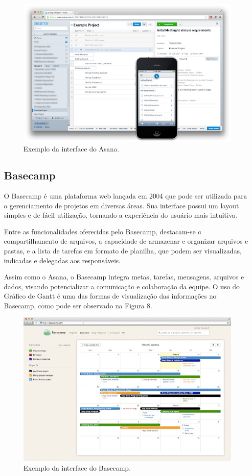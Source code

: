 \begin{figure}[htb]
	\caption{\label{fig:Fig_7}Exemplo da interface do Asana.}
	\begin{center}
		\includegraphics{figuras/Imagem7.png}
	\end{center}
\end{figure}

\subsection{Basecamp}

O Basecamp é uma plataforma web lançada em 2004 que pode ser utilizada para o gerenciamento de projetos em diversas áreas. Sua interface possui um layout simples e de fácil utilização, tornando a experiência do usuário mais intuitiva.

Entre as funcionalidades oferecidas pelo Basecamp, destacam-se o compartilhamento de arquivos, a capacidade de armazenar e organizar arquivos e pastas, e a lista de tarefas em formato de planilha, que podem ser visualizadas, indicadas e delegadas aos responsáveis.

Assim como o Asana, o Basecamp integra metas, tarefas, mensagens, arquivos e dados, visando potencializar a comunicação e colaboração da equipe. O uso do Gráfico de Gantt é uma das formas de visualização das informações no Basecamp, como pode ser observado na Figura 8.

\begin{figure}[htb]
	\caption{\label{fig:Fig_8}Exemplo da interface do Basecamp.}
	\begin{center}
		\includegraphics{figuras/Imagem8.png}
	\end{center}
\end{figure}